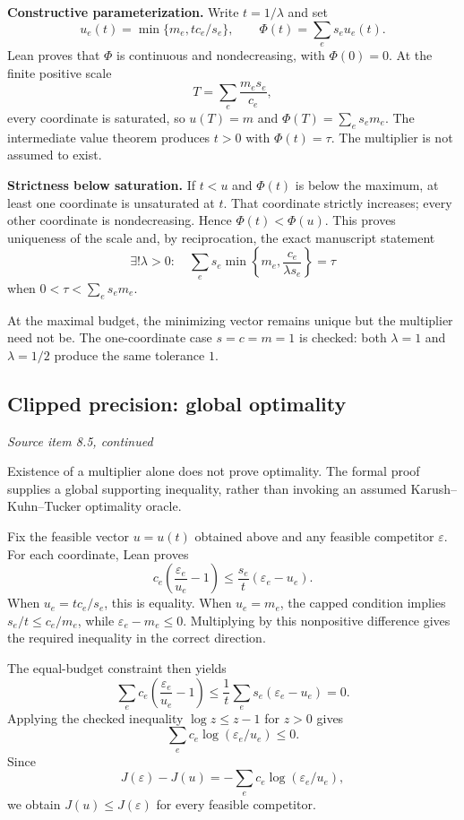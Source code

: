 \textbf{Constructive parameterization.} Write $t=1/\lambda$ and set
\[
u_e(t)=\min\{m_e,tc_e/s_e\},\qquad
\Phi(t)=\sum_e s_eu_e(t).
\]
Lean proves that $\Phi$ is continuous and nondecreasing, with $\Phi(0)=0$. At the finite positive scale
\[
T=\sum_e\frac{m_es_e}{c_e},
\]
every coordinate is saturated, so $u(T)=m$ and $\Phi(T)=\sum_es_em_e$. The intermediate value theorem produces $t>0$ with $\Phi(t)=\tau$. The multiplier is not assumed to exist.

\textbf{Strictness below saturation.} If $t<u$ and $\Phi(t)$ is below the maximum, at least one coordinate is unsaturated at $t$. That coordinate strictly increases; every other coordinate is nondecreasing. Hence $\Phi(t)<\Phi(u)$. This proves uniqueness of the scale and, by reciprocation, the exact manuscript statement
\[
\boxed{\exists!\lambda>0:\quad
\sum_e s_e\min\!\left\{m_e,\frac{c_e}{\lambda s_e}\right\}=\tau}
\]
when $0<\tau<\sum_es_em_e$.

At the maximal budget, the minimizing vector remains unique but the multiplier need not be. The one-coordinate case $s=c=m=1$ is checked: both $\lambda=1$ and $\lambda=1/2$ produce the same tolerance $1$.



\subsection{Clipped precision: global optimality}\label{supp4:subsection:006}\textit{Source item 8.5, continued}\par
Existence of a multiplier alone does not prove optimality. The formal proof supplies a global supporting inequality, rather than invoking an assumed Karush--Kuhn--Tucker optimality oracle.

Fix the feasible vector $u=u(t)$ obtained above and any feasible competitor $\varepsilon$. For each coordinate, Lean proves
\[
\boxed{
 c_e\left(\frac{\varepsilon_e}{u_e}-1\right)
 \le \frac{s_e}{t}(\varepsilon_e-u_e).
}
\]
When $u_e=tc_e/s_e$, this is equality. When $u_e=m_e$, the capped condition implies $s_e/t\le c_e/m_e$, while $\varepsilon_e-m_e\le0$. Multiplying by this nonpositive difference gives the required inequality in the correct direction.

The equal-budget constraint then yields
\[
\sum_e c_e\left(\frac{\varepsilon_e}{u_e}-1\right)
\le\frac1t\sum_e s_e(\varepsilon_e-u_e)=0.
\]
Applying the checked inequality $\log z\le z-1$ for $z>0$ gives
\[
\sum_e c_e\log(\varepsilon_e/u_e)\le0.
\]
Since
\[
J(\varepsilon)-J(u)
=-\sum_e c_e\log(\varepsilon_e/u_e),
\]
we obtain $J(u)\le J(\varepsilon)$ for every feasible competitor.

